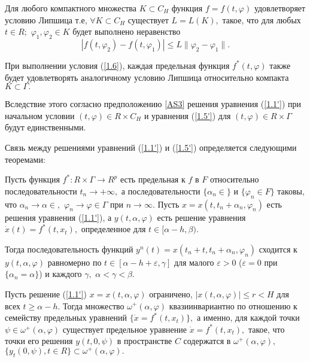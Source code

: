 	\begin{definition}\label{AS3} Для любого компактного множества $K\subset C_H$
		функция $f=f(t,\varphi )$ удовлетворяет условию Липшица т.е, $\forall K\subset C_H$ существует $L=L(K),$ такое, что  для любых
		$t\in R;$ $\varphi _1, \varphi _2\in K$ будет выполнено неравенство
		\begin{equation}
		|f(t,\varphi _2)-f(t,\varphi _1)|\le L\|\varphi _2-\varphi _1\|.
		\label{1.6}
		\end{equation}
	\end{definition}
	
	При выполнении условия (\ref{1.6}), каждая
	предельная функция $f^*(t,\varphi )$ также будет удовлетворять
	аналогичному условию Липшица относительно компакта
	$K\subset\Gamma.$
	
	Вследствие этого согласно предположению  \ref{AS3}
	решения
	уравнения (\ref{1.1'}) при начальном условии $(t,\varphi )\in R 
	\times C_H$ и уравнения (\ref{1.5'}) для $(t,\varphi )\in R
	\times\Gamma $ будут единственными.
	
	Связь между решениями уравнений  (\ref{1.1'})  и  (\ref{1.5'})
	определяется следующими теоремами:
	
	\begin{theorem}\label{t-1.1} Пусть функция $f^*: R \times\Gamma\to R^p$ есть предельная к $f$ в
		$F$ относительно последовательности $t_n\to +\infty, $ а
		последовательности $\{\alpha _n\in \}$ и $\{\varphi _n\in F\}$
		таковы, что $\alpha _n\to\alpha\in ,$ $\varphi
		_n\to\varphi\in\Gamma $ при $n\to\infty .$ Пусть $x=x(t,t_n+\alpha
		_n,\varphi _n)$  есть  решения  уравнения (\ref{1.1'}), а
		$y(t,\alpha ,\varphi )$ есть решение уравнения $\dot
		x(t)=f^*(t,x_t),$ определенное для $t\in [\alpha -h,\beta ).$
		
		Тогда последовательность   функций $y^{n}(t)=x(t_n+t,t_n+\alpha
		_n,\varphi _n)$ сходится  к $y(t,\alpha ,\varphi )$ равномерно  по
		$t\in [\alpha -h+\varepsilon,\gamma ]$ для малого $\varepsilon>0$
		($\varepsilon=0$ при $\{ \alpha_n=\alpha\}$) и каждого $\gamma,$
		$\alpha<\gamma <\beta .$
	\end{theorem}
	
	\begin{theorem}\label{t-1.2}  Пусть  решение  (\ref{1.1'}) $x=x(t,\alpha ,\varphi )$
		ограничено, $|x(t,\alpha ,\varphi)|\le r<H$ для всех $t\ge \alpha
		-h.$ Тогда множество $\omega ^+(\alpha ,\varphi )$
		квазиинвариантно по отношению к семейству предельных уравнений
		$\{\dot x=f^*(t,x_t)\},$ а именно,  для  каждой точки $\psi\in\omega
		^+(\alpha ,\varphi )$ существует предельное уравнение $\dot
		x=f^*(t,x_t),$ такое, что точки его решения
		$y(t,0,\psi )$ в пространстве $C$ содержатся в $\omega^+(\alpha,\varphi ),$
		$\{ y_t(0,\psi ), t\in R\}\subset\omega ^+(\alpha ,\varphi ).$
	\end{theorem}
	
